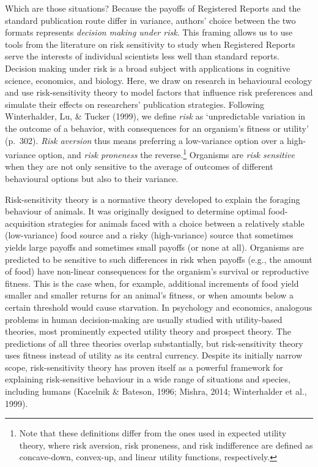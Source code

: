 \documentclass[
  british,
  a4paper,
  ,man,mask,floatsintext]{apa6}
\begin{document}
Which are those situations?
Because the payoffs of Registered Reports and the standard publication route differ in variance, authors' choice between the two formats represents \emph{decision making under risk}.
This framing allows us to use tools from the literature on risk sensitivity to study when Registered Reports serve the interests of individual scientists less well than standard reports.
Decision making under risk is a broad subject with applications in cognitive science, economics, and biology.
Here, we draw on research in behavioural ecology and use risk-sensitivity theory to model factors that influence risk preferences and simulate their effects on researchers' publication strategies.
Following Winterhalder, Lu, \& Tucker (1999), we define \emph{risk} as `unpredictable variation in the outcome of a behavior, with consequences for an organism's fitness or utility' (p.~302).
\emph{Risk aversion} thus means preferring a low-variance option over a high-variance option, and \emph{risk proneness} the reverse.\footnote{Note that these definitions differ from the ones used in expected utility theory, where risk aversion, risk proneness, and risk indifference are defined as concave-down, convex-up, and linear utility functions, respectively.}
Organisms are \emph{risk sensitive} when they are not only sensitive to the average of outcomes of different behavioural options but also to their variance.

Risk-sensitivity theory is a normative theory developed to explain the foraging behaviour of animals.
It was originally designed to determine optimal food-acquisition strategies for animals faced with a choice between a relatively stable (low-variance) food source and a risky (high-variance) source that sometimes yields large payoffs and sometimes small payoffs (or none at all).
Organisms are predicted to be sensitive to such differences in risk when payoffs (e.g., the amount of food) have non-linear consequences for the organism's survival or reproductive fitness.
This is the case when, for example, additional increments of food yield smaller and smaller returns for an animal's fitness, or when amounts below a certain threshold would cause starvation.
In psychology and economics, analogous problems in human decision-making are usually studied with utility-based theories, most prominently expected utility theory and prospect theory.
The predictions of all three theories overlap substantially, but risk-sensitivity theory uses fitness instead of utility as its central currency.
Despite its initially narrow scope, risk-sensitivity theory has proven itself as a powerful framework for explaining risk-sensitive behaviour in a wide range of situations and species, including humans (Kacelnik \& Bateson, 1996; Mishra, 2014; Winterhalder et al., 1999).
\end{document}
